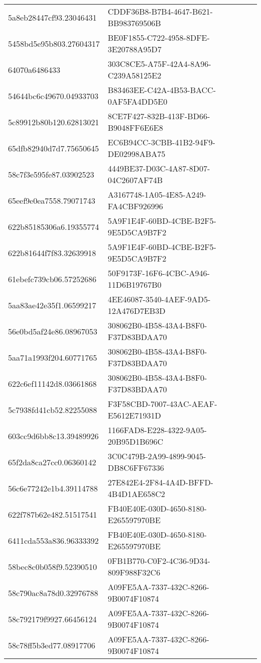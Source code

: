\begin{tabular}{ll}
5a8eb28447cf93.23046431 & CDDF36B8-B7B4-4647-B621-BB983769506B \\
5458bd5e95b803.27604317 & BE0F1855-C722-4958-8DFE-3E20788A95D7 \\
64070a6486433 & 303C8CE5-A75F-42A4-8A96-C239A58125E2 \\
54644bc6c49670.04933703 & B83463EE-C42A-4B53-BACC-0AF5FA4DD5E0 \\
5c89912b80b120.62813021 & 8CE7F427-832B-413F-BD66-B9048FF6E6E8 \\
65dfb82940d7d7.75650645 & EC6B94CC-3CBB-41B2-94F9-DE02998ABA75 \\
58c7f3e595fe87.03902523 & 4449BE37-D03C-4A87-8D07-04C2607AF74B \\
65eef9e0ea7558.79071743 & A3167748-1A05-4E85-A249-FA4CBF926996 \\
622b85185306a6.19355774 & 5A9F1E4F-60BD-4CBE-B2F5-9E5D5CA9B7F2 \\
622b81644f7f83.32639918 & 5A9F1E4F-60BD-4CBE-B2F5-9E5D5CA9B7F2 \\
61ebefc739cb06.57252686 & 50F9173F-16F6-4CBC-A946-11D6B19767B0 \\
5aa83ae42e35f1.06599217 & 4EE46087-3540-4AEF-9AD5-12A476D7EB3D \\
56e0bd5af24e86.08967053 & 308062B0-4B58-43A4-B8F0-F37D83BDAA70 \\
5aa71a1993f204.60771765 & 308062B0-4B58-43A4-B8F0-F37D83BDAA70 \\
622c6ef11142d8.03661868 & 308062B0-4B58-43A4-B8F0-F37D83BDAA70 \\
5c7938fd41cb52.82255088 & F3F58CBD-7007-43AC-AEAF-E5612E71931D \\
603cc9d6bb8c13.39489926 & 1166FAD8-E228-4322-9A05-20B95D1B696C \\
65f2da8ca27cc0.06360142 & 3C0C479B-2A99-4899-9045-DB8C6FF67336 \\
56c6e77242e1b4.39114788 & 27E842E4-2F84-4A4D-BFFD-4B4D1AE658C2 \\
622f787b62e482.51517541 & FB40E40E-030D-4650-8180-E265597970BE \\
6411cda553a836.96333392 & FB40E40E-030D-4650-8180-E265597970BE \\
58bec8c0b058f9.52390510 & 0FB1B770-C0F2-4C36-9D34-809F988F32C6 \\
58c790ac8a78d0.32976788 & A09FE5AA-7337-432C-8266-9B0074F10874 \\
58c792179f9927.66456124 & A09FE5AA-7337-432C-8266-9B0074F10874 \\
58c78ff5b3ed77.08917706 & A09FE5AA-7337-432C-8266-9B0074F10874 \\

\end{tabular}
